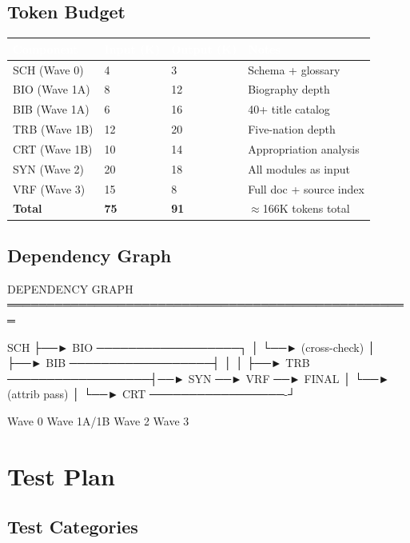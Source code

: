 \documentclass[11pt,letterpaper]{article}
\newcommand{\tableheader}[1]{\textbf{\sffamily\textcolor{white}{#1}}}
\begin{document}
\subsection{Token Budget}

\begin{center}
\begin{tabularx}{\textwidth}{L{3cm}C{2cm}C{2cm}X}
\toprule
{}
\tableheader{Component} & \tableheader{Input (K)} & \tableheader{Output (K)} & \tableheader{Notes} \\
\midrule
SCH (Wave 0) & 4 & 3 & Schema + glossary \\
BIO (Wave 1A) & 8 & 12 & Biography depth \\
BIB (Wave 1A) & 6 & 16 & 40+ title catalog \\
TRB (Wave 1B) & 12 & 20 & Five-nation depth \\
CRT (Wave 1B) & 10 & 14 & Appropriation analysis \\
SYN (Wave 2) & 20 & 18 & All modules as input \\
VRF (Wave 3) & 15 & 8 & Full doc + source index \\
\midrule
\textbf{Total} & \textbf{75} & \textbf{91} & $\approx$166K tokens total \\
\bottomrule
\end{tabularx}
\end{center}

\subsection{Dependency Graph}

\begin{asciibox}
DEPENDENCY GRAPH
═══════════════════════════════════════════════════

  SCH
   ├──► BIO ──────────────────┐
   │     └──► (cross-check)   │
   ├──► BIB ──────────────────┤
   │                          │
   ├──► TRB ──────────────────┤──► SYN ──► VRF ──► FINAL
   │     └──► (attrib pass)   │
   └──► CRT ─────────────────-┘

Wave 0      Wave 1A/1B          Wave 2      Wave 3
\end{asciibox}

\section{Test Plan}

\subsection{Test Categories}
\end{document}
